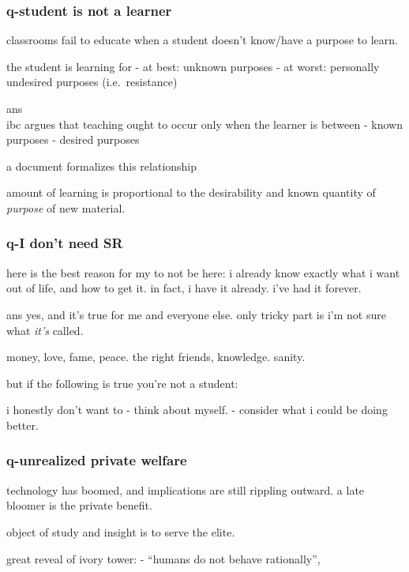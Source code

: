 \documentclass[
]{book}
\begin{document}
\hypertarget{q-student-is-not-a-learner}{%
\subsubsection{q-student is not a learner}\label{q-student-is-not-a-learner}}

classrooms fail to educate when a student doesn't know/have a purpose to learn.

the student is learning for
- at best: unknown purposes
- at worst: personally undesired purposes (i.e.~resistance)

ans\\
ibc argues that teaching ought to occur only when the learner is between
- known purposes
- desired purposes

a document formalizes this relationship

amount of learning is proportional to the desirability and known quantity of \emph{purpose} of new material.

\hypertarget{q-i-dont-need-sr}{%
\subsubsection{q-I don't need SR}\label{q-i-dont-need-sr}}

here is the best reason for
my to not be here:
i already know exactly what
i want out of life,
and how to get it.
in fact, i have it already.
i've had it forever.

ans
yes, and it's true for me and everyone else.
only tricky part is i'm not sure what \emph{it's} called.

money, love, fame, peace.
the right friends, knowledge. sanity.

but if the following is true
you're not a student:

i honestly don't want to
- think about myself.
- consider what i could be doing better.

\hypertarget{q-unrealized-private-welfare}{%
\subsubsection{q-unrealized private welfare}\label{q-unrealized-private-welfare}}

technology has boomed, and implications are still rippling outward. a late bloomer is the private benefit.

object of study and insight is to serve the elite.

great reveal of ivory tower:
- ``humans do not behave rationally'',
\end{document}
